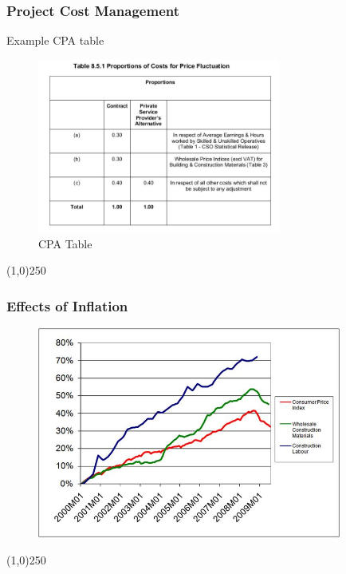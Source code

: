 \begin{frame}
\frametitle{Project Cost Management}
Example CPA table
\begin{figure}
	\centering
		\includegraphics[width = 8cm]{images/CPA.jpg}
	\caption{CPA Table}
	\label{fig:CPA}
\end{figure}
\end{frame}
\begin{center}\line(1,0){250}\end{center}






\begin{frame}
\frametitle{Effects of Inflation}
 \begin{figure}
 	\centering
 		\includegraphics[width = 10cm]{images/deflation.jpg}
 	\label{fig:deflation}
 \end{figure}
\end{frame}
\begin{center}\line(1,0){250}\end{center}






